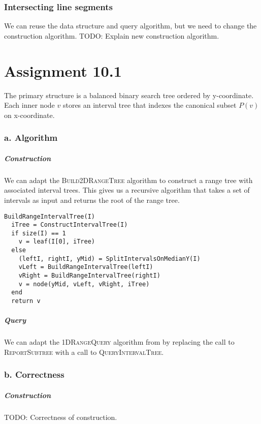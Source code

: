 \documentclass[10pt,a4paper,final,oneside,openany,article]{memoir}
\begin{document}
\subsection*{Intersecting line segments}
We can reuse the data structure and query algorithm, but we need to change the construction algorithm. TODO: Explain new construction algorithm.




\chapter*{Assignment 10.1}
The primary structure is a balanced binary search tree ordered by y-coordinate. Each inner node $v$ stores an interval tree that indexes the canonical subset $P(v)$ on x-coordinate.

\subsection*{a. Algorithm}

\paragraph{Construction}
We can adapt the \textsc{Build2DRangeTree} algorithm to construct a range tree with associated interval trees. This gives us a recursive algorithm that takes a set of intervals as input and returns the root of the range tree.
\begin{verbatim}
BuildRangeIntervalTree(I)  
  iTree = ConstructIntervalTree(I)
  if size(I) == 1
    v = leaf(I[0], iTree)
  else
    (leftI, rightI, yMid) = SplitIntervalsOnMedianY(I)
    vLeft = BuildRangeIntervalTree(leftI)
    vRight = BuildRangeIntervalTree(rightI)
    v = node(yMid, vLeft, vRight, iTree)
  end
  return v
\end{verbatim}

\paragraph{Query}
We can adapt the \textsc{ 1DRangeQuery} algorithm from \cite{deBerg} by replacing the call to \textsc{ ReportSubtree} with a call to \textsc{ QueryIntervalTree}.


\subsection*{b. Correctness}
\paragraph{Construction}
TODO: Correctness of construction.
\end{document}
